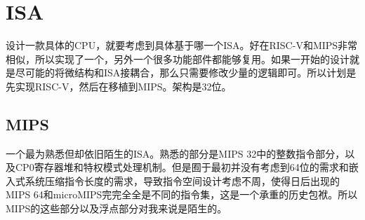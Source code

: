 \documentclass[twocolumn,10pt]{article}
\begin{document}
\section{ISA}
设计一款具体的CPU，就要考虑到具体基于哪一个ISA。好在RISC-V和MIPS非常相似，所以实现了一个，另外一个很多功能部件都能够复用。如果一开始的设计就是尽可能的将微结构和ISA接耦合，那么只需要修改少量的逻辑即可。所以计划是先实现RISC-V，然后在移植到MIPS。架构是32位。
\subsection{MIPS}
一个最为熟悉但却依旧陌生的ISA。熟悉的部分是MIPS 32中的整数指令部分，以及CP0寄存器堆和特权模式处理机制。但是囿于最初并没有考虑到64位的需求和嵌入式系统压缩指令长度的需求，导致指令空间设计考虑不周，使得日后出现的MIPS 64和microMIPS完完全全是不同的指令集，这是一个承重的历史包袱。所以MIPS的这些部分以及浮点部分对我来说是陌生的。
\end{document}
